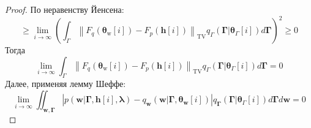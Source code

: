 \documentclass[12pt]{article}
\numberwithin{equation}{section}
\begin{document}
\begin{proof}
	По неравенству Йенсена:
	$$\geq \lim _{i \rightarrow \infty}\left(\int_{\Gamma}\left\|F_{q}\left(\boldsymbol{\theta}_{\mathrm{w}}[i]\right)-F_{p}(\mathbf{h}[i])\right\|_{\mathrm{TV}} q_{\Gamma}\left(\boldsymbol{\Gamma} | \boldsymbol{\theta}_{\Gamma}[i]\right) d \boldsymbol{\Gamma}\right)^{2} \geq 0$$ 
	Тогда 
	$$\lim _{i \rightarrow \infty} \int_{\Gamma}\left\|F_{q}\left(\boldsymbol{\theta}_{\mathrm{w}}[i]\right)-F_{p}(\mathbf{h}[i])\right\|_{\mathrm{TV}} q_{\Gamma}\left(\boldsymbol{\Gamma} | \boldsymbol{\theta}_{\Gamma}[i]\right) d \boldsymbol{\Gamma}=0$$
	Далее, применяя лемму Шеффе:
	$$\lim _{i \rightarrow \infty}  \iint_{\mathbf{w}, \mathbf{\Gamma}}\left|p(\mathbf{w} | \mathbf{\Gamma}, \mathbf{h}[i], \boldsymbol{\lambda})-q_{\mathbf{w}}\left(\mathbf{w} | \mathbf{\Gamma}, \boldsymbol{\theta}_{\mathbf{w}}[i]\right)\right| q_{\mathbf{\Gamma}}\left(\mathbf{\Gamma} | \boldsymbol{\theta}_{\Gamma}[i]\right) d \mathbf{\Gamma} d \mathbf{w}=0$$
		\end{proof}
\end{document}
